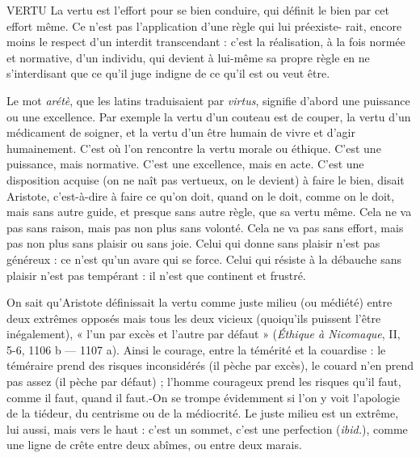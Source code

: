 VERTU La vertu est l'effort pour se bien conduire, qui définit le bien par cet
effort même. Ce n’est pas l'application d’une règle qui lui préexiste-
rait, encore moins le respect d’un interdit transcendant : c’est la réalisation, à la
fois normée et normative, d’un individu, qui devient à lui-même sa propre
règle en ne s’interdisant que ce qu’il juge indigne de ce qu’il est ou veut être.

Le mot {\it arétè}, que les latins traduisaient par {\it virtus}, signifie d’abord une puissance
ou une excellence. Par exemple la vertu d’un couteau est de couper, la
vertu d’un médicament de soigner, et la vertu d’un être humain de vivre et
d’agir humainement. C’est où l’on rencontre la vertu morale ou éthique. C’est
une puissance, mais normative. C’est une excellence, mais en acte. C’est une
disposition acquise (on ne naît pas vertueux, on le devient) à faire le bien, disait
Aristote, c’est-à-dire à faire ce qu’on doit, quand on le doit, comme on le doit,
mais sans autre guide, et presque sans autre règle, que sa vertu même. Cela ne
va pas sans raison, mais pas non plus sans volonté. Cela ne va pas sans effort,
mais pas non plus sans plaisir ou sans joie. Celui qui donne sans plaisir n’est pas
généreux : ce n’est qu’un avare qui se force. Celui qui résiste à la débauche sans
plaisir n’est pas tempérant : il n’est que continent et frustré.

On sait qu’Aristote définissait la vertu comme juste milieu (ou médiété) entre
deux extrêmes opposés mais tous les deux vicieux (quoiqu’ils puissent l'être inégalement),
« l'un par excès et l’autre par défaut » ({\it Éthique à Nicomaque}, II, 5-6,
1106 b — 1107 a). Ainsi le courage, entre la témérité et la couardise : le téméraire
prend des risques inconsidérés (il pèche par excès), le couard n’en prend pas assez
(il pèche par défaut) ; l'homme courageux prend les risques qu’il faut, comme il
faut, quand il faut.-On se trompe évidemment si l’on y voit l’apologie de la tiédeur,
du centrisme ou de la médiocrité. Le juste milieu est un extrême, lui aussi,
mais vers le haut : c’est un sommet, c’est une perfection ({\it ibid.}), comme une ligne
de crête entre deux abîmes, ou entre deux marais.

